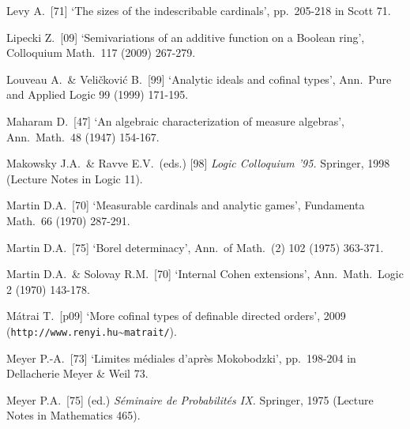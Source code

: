 {Levy A.\ [71] `The sizes of the indescribable cardinals',
pp.\ 205-218 in {\smc Scott 71}.

Lipecki Z.\ [09]
`Semivariations of an additive function on a Boolean ring',
Colloquium Math.\ 117 (2009) 267-279.
\cmmnt{[552Xe.]}



Louveau A.\ \& Veli\v{c}kovi\'c B.\ [99] `Analytic ideals and cofinal
types', Ann.\ Pure and Applied Logic 99 (1999) 171-195.

\medskip%

Maharam D.\ [47] `An algebraic characterization of measure algebras',
Ann.\ Math.\ 48 (1947) 154-167.
\cmmnt{[539P.]}

Makowsky J.A.\ \& Ravve E.V.\ (eds.) [98]
{\it Logic Colloquium '95.}  Springer, 1998 (Lecture Notes in Logic 11).

Martin D.A.\ [70] `Measurable cardinals and analytic games',
Fundamenta Math.\ 66 (1970) 287-291.
\cmmnt{[567N.]}

Martin D.A.\ [75] `Borel determinacy', Ann.\ of Math.\ (2) 102 (1975)
363-371.
\cmmnt{[\S567 {\it notes\/}.]}

Martin D.A.\ \& Solovay R.M.\ [70] `Internal Cohen
extensions', Ann.\ Math.\ Logic 2 (1970) 143-178.


M\'atrai T.\ [p09] `More cofinal types of definable directed orders', 2009
({\tt http://www.renyi.hu{\bsp}$\sptilde$matrait/}).
\cmmnt{[526L, \S526 {\it notes\/}.]}


Meyer P.-A.\ [73] `Limites m\'ediales d'apr\`es Mokobodzki',
pp.\ 198-204 in {\smc Dellacherie Meyer \& Weil 73}.
\cmmnt{[538Yl.]}

Meyer P.A.\ [75] (ed.) {\it S\'eminaire de Probabilit\'es IX.}
Springer, 1975 (Lecture Notes in Mathematics 465).

}
